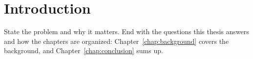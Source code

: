 \chapter{Introduction}
\label{chap:introduction}

State the problem and why it matters. End with the questions this thesis answers and how the
chapters are organized: Chapter~\ref{chap:background} covers the background, and
Chapter~\ref{chap:conclusion} sums up.
